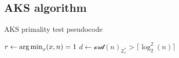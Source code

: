 \subsection{AKS algorithm}
\begin{algorithm}
    \caption{AKS primality test pseudocode}\label{alg:aks_pscd_ptest}
    \label{step_1_aks}
    $r \gets \operatorname*{arg\,min}_{x} (x,n) = 1$\;
    $d \gets \mathcal{ord}(n)_{\mathbb{Z}_{r}^{*}} > \lceil \operatorname{log}_{2}^{2}(n) \rceil$\;\label{step_2_aks}
    \label{step_3_aks}
    \label{step_4_aks}
    \label{step_5_aks}
    \;\label{step_6_aks}
\end{algorithm}

